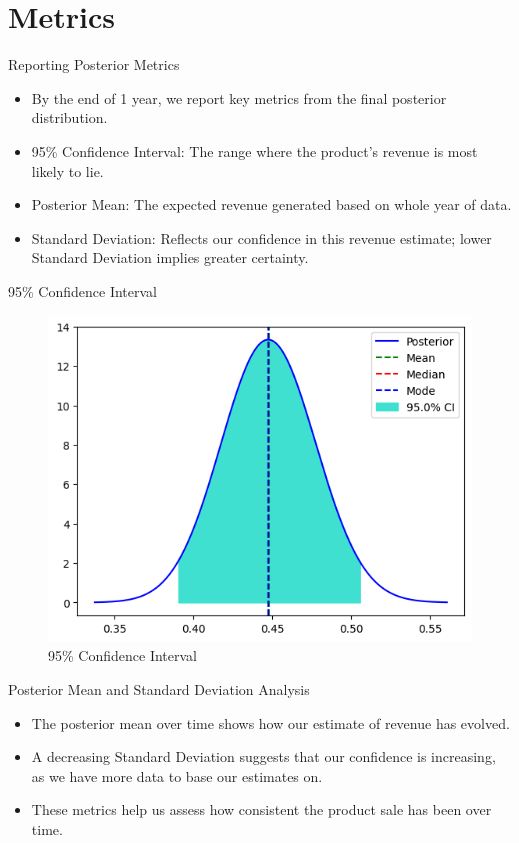 \section{Metrics}

\begin{frame}{Reporting Posterior Metrics}

  \begin{itemize}
    \item By the end of 1 year, we report key metrics from the final posterior distribution.
    \item 95\% Confidence Interval: The range where the product's revenue is most likely to lie.
    \item Posterior Mean: The expected revenue generated based on whole year of data.
    \item Standard Deviation: Reflects our confidence in this revenue estimate; lower Standard Deviation implies greater certainty.
  \end{itemize}
  
\end{frame}

\begin{frame}{95\% Confidence Interval}

\begin{figure}
  \centering
  \includegraphics[width=.8\linewidth]{../Report/images/confidence-interval.png}
  \caption{95\% Confidence Interval}
\end{figure}
  
\end{frame}

\begin{frame}{Posterior Mean and Standard Deviation Analysis}

  \begin{itemize}
    \item The posterior mean over time shows how our estimate of revenue has evolved.
    \item A decreasing Standard Deviation suggests that our confidence is increasing, as we have more data to base our estimates on.
    \item These metrics help us assess how consistent the product sale has been over time.
  \end{itemize}
  
\end{frame}

